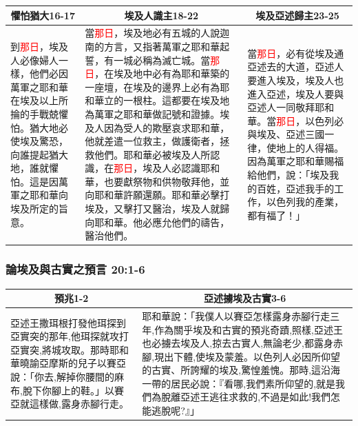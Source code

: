 \begin{table}[H]
\centering
\begin{tabular}{p{3.25cm}|p{9.250cm}|p{4.75cm}}\hline\hline
\multicolumn{1}{c|}{懼怕猶大16-17}&\multicolumn{1}{c|}{埃及人識主18-22}&\multicolumn{1}{c}{埃及亞述歸主23-25}\\\hline
到\textcolor{red}{那日}，埃及人必像婦人一樣，他們必因萬軍之耶和華在埃及以上所掄的手戰兢懼怕。猶大地必使埃及驚恐，向誰提起猶大地，誰就懼怕。這是因萬軍之耶和華向埃及所定的旨意。
&當\textcolor{red}{那日}，埃及地必有五城的人說迦南的方言，又指著萬軍之耶和華起誓，有一城必稱為滅亡城。當\textcolor{red}{那日}，在埃及地中必有為耶和華築的一座壇，在埃及的邊界上必有為耶和華立的一根柱。這都要在埃及地為萬軍之耶和華做記號和證據。埃及人因為受人的欺壓哀求耶和華，他就差遣一位救主，做護衛者，拯救他們。耶和華必被埃及人所認識，在\textcolor{red}{那日}，埃及人必認識耶和華，也要獻祭物和供物敬拜他，並向耶和華許願還願。耶和華必擊打埃及，又擊打又醫治，埃及人就歸向耶和華。他必應允他們的禱告，醫治他們。
&當\textcolor{red}{那日}，必有從埃及通亞述去的大道，亞述人要進入埃及，埃及人也進入亞述，埃及人要與亞述人一同敬拜耶和華。當\textcolor{red}{那日}，以色列必與埃及、亞述三國一律，使地上的人得福。因為萬軍之耶和華賜福給他們，說：「埃及我的百姓，亞述我手的工作，以色列我的產業，都有福了！」\\\hline
\end{tabular}
\end{table}


\subsubsection{論埃及與古實之預言 20:1-6}
\begin{table}[H]
\centering
\begin{tabular}{p{6.25cm}|p{11.0cm}}\hline\hline
\multicolumn{1}{c|}{預兆1-2}&\multicolumn{1}{c}{亞述擄埃及古實3-6}\\\hline
亞述王撒珥根打發他珥探到亞實突的那年,他珥探就攻打亞實突,將城攻取。那時耶和華曉諭亞摩斯的兒子以賽亞說：「你去,解掉你腰間的麻布,脫下你腳上的鞋。」以賽亞就這樣做,露身赤腳行走。 
&耶和華說：「我僕人以賽亞怎樣露身赤腳行走三年,作為關乎埃及和古實的預兆奇蹟,照樣,亞述王也必擄去埃及人,掠去古實人,無論老少,都露身赤腳,現出下體,使埃及蒙羞。以色列人必因所仰望的古實、所誇耀的埃及,驚惶羞愧。那時,這沿海一帶的居民必說：『看哪,我們素所仰望的,就是我們為脫離亞述王逃往求救的,不過是如此!我們怎能逃脫呢?』」
\\\hline
\end{tabular}
\end{table}



